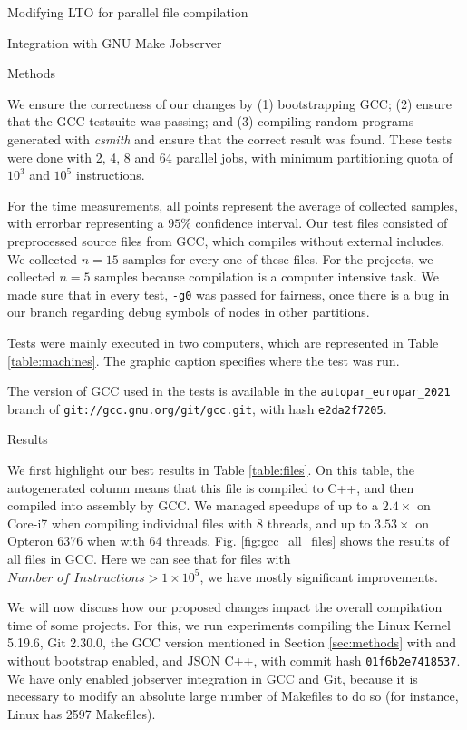\begin{section}{Modifying LTO for parallel file compilation}
\begin{subsection}{Integration with GNU Make Jobserver}
\end{subsection}

\begin{subsection}{Methods}\label{sec:methods}

We ensure the correctness of our changes by (1) bootstrapping GCC; (2) ensure
that the GCC testsuite was passing; and (3) compiling random programs generated
with \textit{csmith} \cite{csmith} and ensure that the correct result was
found. These tests were done with 2, 4, 8 and 64 parallel jobs, with minimum
partitioning quota of $10^3$ and $10^5$ instructions.

For the time measurements, all points represent the average of collected
samples, with errorbar representing a $95\%$ confidence interval.
Our test files consisted of preprocessed source files from GCC, which compiles
without external includes. We collected $n = 15$ samples for every one of these
files. For the projects, we collected $n = 5$ samples because compilation is a
computer intensive task. We made sure that in every test, \texttt{-g0} was passed
for fairness, once there is a bug in our branch regarding debug symbols of
nodes in other partitions.

Tests were mainly executed in two computers, which are represented
in Table \ref{table:machines}. The graphic caption specifies where the test
was run.

The version of GCC used in the tests is available in the \texttt{autopar\_europar\_2021}
branch of \texttt{git://gcc.gnu.org/git/gcc.git}, with hash \texttt{e2da2f7205}.

\end{subsection}

\begin{subsection}{Results}\label{sec:results}

We first highlight our best results in Table \ref{table:files}. On this table,
the autogenerated column means that this file is compiled to C++, and then compiled
into assembly by GCC. We managed speedups of up to a $2.4\times$ on Core-i7 when
compiling individual files with 8 threads, and up to $3.53\times$ on Opteron 6376 when
with 64 threads. Fig. \ref{fig:gcc_all_files} shows the results
of all files in GCC. Here we can see that for files with $\textit{Number of Instructions} >
1 \times 10^5$, we have mostly significant improvements.

We will now discuss how our proposed changes impact the overall compilation
time of some projects. For this, we run experiments compiling
the Linux Kernel 5.19.6, Git 2.30.0, the GCC version mentioned in
Section \ref{sec:methods} with and without bootstrap enabled, and JSON C++, with
commit hash \texttt{01f6b2e7418537}. We have only enabled jobserver integration
in GCC and Git, because it is necessary to modify an absolute large number
of Makefiles to do so (for instance, Linux has 2597 Makefiles).


\end{subsection}
\end{section}
